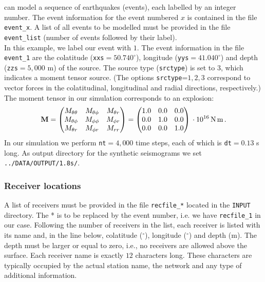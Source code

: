 \SES can model a sequence of earthquakes (events), each labelled by an integer number. The event information for the event numbered $x$ is contained in the file \texttt{event\_x}. A list of all events to be modelled must be provided in the file \texttt{event\_list} (number of events followed by their label).\\[5pt]
In this example, we label our event with $1$. The event information in the file \texttt{event\_1} are the colatitude (\texttt{xxs}$=50.740^\circ$), longitude (\texttt{yys}$=41.040^\circ$) and depth (\texttt{zzs}$=5,000$ m) of the source. The source type (\texttt{srctype}) is set to $3$, which indicates a moment tensor source. (The options \texttt{srctype}=$1,2,3$ correspond to vector forces in the colatitudinal, longitudinal and radial directions, respectively.) The moment tensor in our simulation corresponds to an explosion:
\begin{equation}
\mathbf{M}=\begin{pmatrix}
M_{\theta\theta} & M_{\theta\phi} & M_{\theta r} \\
M_{\theta\phi} & M_{\phi\phi} & M_{\phi r} \\
M_{\theta r} & M_{\phi r} & M_{ r r}
\end{pmatrix}
=
\begin{pmatrix}
1.0 & 0.0 & 0.0 \\
0.0 & 1.0 & 0.0 \\
0.0 & 0.0 & 1.0
\end{pmatrix}\, \cdot 10^{16}\,\text{N\,m}\,.
\end{equation}
In our simulation we perform \texttt{nt}$=4,000$ time steps, each of which is \texttt{dt}$=0.13$ s long. As output directory for the synthetic seismograms we set \texttt{../DATA/OUTPUT/1.8s/}.

\subsubsection{Receiver locations}

A list of receivers must be provided in the file \texttt{recfile\_*} located in the \texttt{INPUT} directory. The * is to be replaced by the event number, i.e. we have \texttt{recfile\_1} in our case. Following the number of receivers in the list, each receiver is listed with its name and, in the line below, colatitude ($^\circ$), longitude ($^\circ$) and depth (m). The depth must be larger or equal to zero, i.e., no receivers are allowed above the surface. Each receiver name is exactly $12$ characters long. These characters are typically occupied by the actual station name, the network and any type of additional information.

